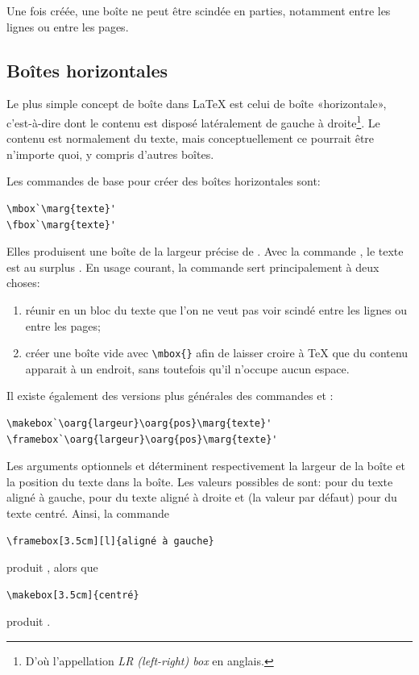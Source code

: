 Une fois créée, une boîte ne peut être scindée en parties, notamment
entre les lignes ou entre les pages.


\subsection{Boîtes horizontales}
\label{sec:tableaux:boites:lrbox}

Le plus simple concept de boîte dans {\LaTeX} est celui de boîte
«horizontale», c'est-à-dire dont le contenu est disposé latéralement
de gauche à droite\footnote{%
  D'où l'appellation \emph{LR (left-right) box} en anglais.}. %
Le contenu est normalement du texte, mais conceptuellement ce pourrait
être n'importe quoi, y compris d'autres boîtes.

Les commandes de base pour créer des boîtes horizontales sont:
\begin{lstlisting}
\mbox`\marg{texte}'
\fbox`\marg{texte}'
\end{lstlisting}
Elles produisent une boîte de la largeur précise de . Avec
la commande \cmd{\fbox}, le texte est au surplus . En
usage courant, la commande \cmd{\mbox} sert principalement à deux
choses:
\begin{enumerate}
\item réunir en un bloc du texte que l'on ne veut pas voir scindé
  entre les lignes ou entre les pages;
\item \label{item:tableaux:mbox} créer une boîte vide avec
  \verb=\mbox{}= afin de laisser croire à {\TeX} que du contenu
  apparait à un endroit, sans toutefois qu'il n'occupe aucun espace.
\end{enumerate}

Il existe également des versions plus générales des commandes
\cmd{\mbox} et \cmd{\fbox}:
\begin{lstlisting}
\makebox`\oarg{largeur}\oarg{pos}\marg{texte}'
\framebox`\oarg{largeur}\oarg{pos}\marg{texte}'
\end{lstlisting}
Les arguments optionnels  et  déterminent
respectivement la largeur de la boîte et la position du texte
dans la boîte. Les valeurs possibles de  sont:  pour
du texte aligné à gauche,  pour du texte aligné à droite et
 (la valeur par défaut) pour du texte centré. Ainsi, la commande
\begin{lstlisting}
\framebox[3.5cm][l]{aligné à gauche}
\end{lstlisting}
produit , alors que
\begin{lstlisting}
\makebox[3.5cm]{centré}
\end{lstlisting}
produit .

